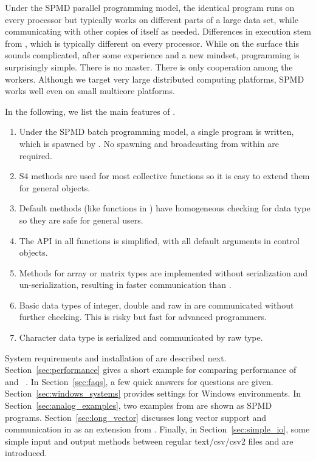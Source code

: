 Under the SPMD parallel programming model, the identical program runs
on every processor but typically works on different parts of a large
data set, while communicating with other copies of itself as
needed. Differences in execution stem from , which is
typically different on every processor. While on the surface this
sounds complicated, after some experience and a new mindset,
programming is surprisingly simple. There is no master. There is only
cooperation among the workers. Although we target very large
distributed computing platforms, SPMD works well even on small
multicore platforms.

In the following, we list the main features of .
\begin{enumerate}
\item Under the SPMD batch programming model, a single program is
  written, which is spawned by . No spawning
  and broadcasting from within  are required.
\item S4 methods are used for most collective functions so it is easy
  to extend them for general  objects.
\item Default methods (like  functions in ) have
  homogeneous checking for data type so they are safe for general
  users.
\item The API in all functions is simplified, with all default arguments
  in control objects.
\item Methods for array or matrix types are implemented without
  serialization and un-serialization, resulting in faster
  communication than .
\item Basic data types of integer, double and raw in  are
  communicated without further checking. This is risky but fast for
  advanced programmers.
\item Character data type is serialized and communicated by raw type.
\end{enumerate}

System requirements and installation of  are described
next.  Section~\ref{sec:performance} gives a short example for
comparing performance of  and ~\citep{Yu2002}.
In Section~\ref{sec:faqs}, a few quick answers for questions are
given.  Section~\ref{sec:windows_systems} provides settings for
Windows environments.  In Section~\ref{sec:analog_examples},
two examples from  are shown as SPMD 
programs. Section~\ref{sec:long_vector} discusses long vector support
and communication in  as an extension from .
Finally, in Section~\ref{sec:simple_io}, some simple input and output
methods between regular text/csv/csv2 files and  are
introduced.


